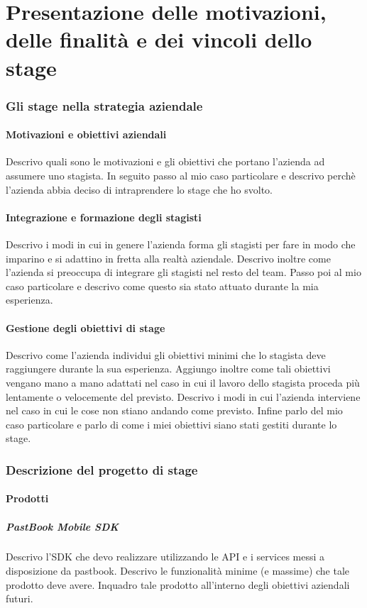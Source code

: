 \part{Presentazione delle motivazioni, delle finalità e dei vincoli dello stage}
	\section{Gli stage nella strategia aziendale}
		\subsection{Motivazioni e obiettivi aziendali}
			Descrivo quali sono le motivazioni e gli obiettivi che portano l'azienda ad assumere uno stagista. In seguito passo al mio
			caso particolare e descrivo perchè l'azienda abbia deciso di intraprendere lo stage che ho svolto.
		\subsection{Integrazione e formazione degli stagisti}
			Descrivo i modi in cui in genere l'azienda forma gli stagisti per fare in modo che imparino e si adattino in fretta alla
			realtà aziendale. Descrivo inoltre come l'azienda si preoccupa di integrare gli stagisti nel resto del team.
			Passo poi al mio caso particolare e descrivo come questo sia stato attuato durante la mia esperienza.
		\subsection{Gestione degli obiettivi di stage}
			Descrivo come l'azienda individui gli obiettivi minimi che lo stagista deve raggiungere durante la sua esperienza. Aggiungo
			inoltre come tali obiettivi vengano mano a mano adattati nel caso in cui il lavoro dello stagista proceda più lentamente o
			velocemente del previsto. Descrivo i modi in cui l'azienda interviene nel caso in cui le cose non stiano andando come
			previsto. Infine parlo del mio caso particolare e parlo di come i miei obiettivi siano stati gestiti durante lo stage.
	\section{Descrizione del progetto di stage}
		\subsection{Prodotti}
			\subsubsection{PastBook Mobile SDK}
				Descrivo l'SDK che devo realizzare utilizzando le API e i services messi a disposizione da pastbook. Descrivo le
				funzionalità minime (e massime) che tale prodotto deve avere. Inquadro tale prodotto all'interno degli obiettivi
				aziendali futuri.
